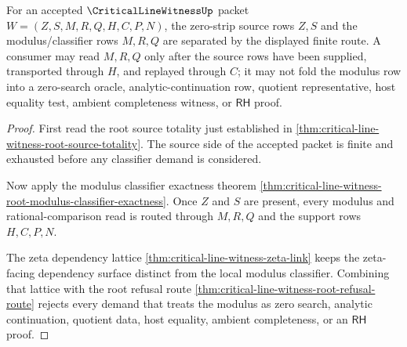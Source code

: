 \begin{theorem}
\label{thm:critical-line-witness-root-modulus-separation}
For an accepted $\CriticalLineWitnessUp$ packet $W=(Z,S,M,R,Q,H,C,P,N)$, the zero-strip source rows $Z,S$ and the modulus/classifier rows $M,R,Q$ are separated by the displayed finite route. A consumer may read $M,R,Q$ only after the source rows have been supplied, transported through $H$, and replayed through $C$; it may not fold the modulus row into a zero-search oracle, analytic-continuation row, quotient representative, host equality test, ambient completeness witness, or $\mathsf{RH}$ proof.
\end{theorem}
\begin{proof}
First read the root source totality just established in \autoref{thm:critical-line-witness-root-source-totality}. The source side of the accepted packet is finite and exhausted before any classifier demand is considered.

Now apply the modulus classifier exactness theorem \autoref{thm:critical-line-witness-root-modulus-classifier-exactness}. Once $Z$ and $S$ are present, every modulus and rational-comparison read is routed through $M,R,Q$ and the support rows $H,C,P,N$.

The zeta dependency lattice \autoref{thm:critical-line-witness-zeta-link} keeps the zeta-facing dependency surface distinct from the local modulus classifier. Combining that lattice with the root refusal route \autoref{thm:critical-line-witness-root-refusal-route} rejects every demand that treats the modulus as zero search, analytic continuation, quotient data, host equality, ambient completeness, or an $\mathsf{RH}$ proof.
\end{proof}

